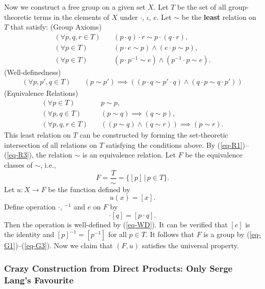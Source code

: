 Now we construct a free group on a given set $X$. Let $T$ be the set of all group-theoretic terms in the elements of $X$ under $\cdot$, $\iota$, $e$. Let $\sim$ be the \textbf{least} relation on $T$ that satisfy:
(Group Axioms)
\begin{align}
	(\forall p, q, r \in T) \quad &(p \cdot q) \cdot r \sim p \cdot (q \cdot r),  \label{eq-G1} \tag{G1}\\
	(\forall p \in T) \quad &(p \cdot e \sim p) \land (e \cdot p \sim p), \tag{G2}\\
	(\forall p \in T) \quad &(p \cdot p^{-1} \sim e) \land (p^{-1} \cdot p \sim e).  \label{eq-G3}\tag{G3}
\end{align}
(Well-definedness)
\begin{align}
	(\forall p, p', q \in T) \quad &(p \sim p') \implies ((p \cdot q \sim p' \cdot q) \land (q \cdot p \sim q \cdot p')) \label{eq-WD}\tag{WD}
\end{align}
(Equivalence Relations)
\begin{align}
	(\forall p \in T) \quad &p \sim p, \label{eq-R1} \tag{R1} \\
	(\forall p, q \in T) \quad &(p \sim q) \implies (q \sim p), \tag{R2}\\
	(\forall p, q, r \in T) \quad &((p \sim q) \land (q \sim r)) \implies (p \sim r).\label{eq-R3} \tag{R3}
\end{align}
This least relation on $T$ can be constructed by forming the set-theoretic intersection of all relations on $T$ satisfying the conditions above. By (\ref{eq-R1})--(\ref{eq-R3}), the relation $\sim$ is an equivalence relation. Let $F$ be the equivalence classes of $\sim$, i.e.,
\begin{equation*}
	F = \frac{T}{\sim} =\{[p]\,|\, p\in T\}.
\end{equation*}
Let $u:X\rightarrow F$ be the function defined by
\begin{equation*}
	u(x) = [x].
\end{equation*}
Define operation $\cdot$, ${}^{-1}$ and $e$ on $F$ by
\begin{equation*}
	[p]\cdot [q] = [p\cdot q].
\end{equation*}
Then the operation is well-defined by (\ref{eq-WD}). It can be verified that $[e]$ is the identity and $[p]^{-1} = [p^{-1}]$ for all $p\in T$. It follows that $F$ is a group by (\ref{eq-G1})--(\ref{eq-G3}). Now we claim that $(F,u)$ satisfies the universal property.



\subsubsection{Crazy Construction from Direct Products: Only Serge Lang's Favourite}
